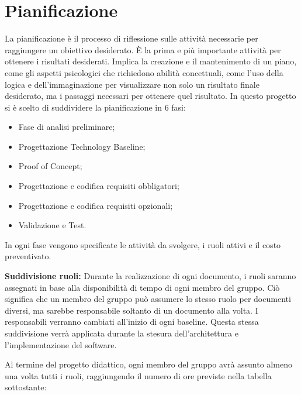 \chapter{Pianificazione}
La pianificazione è il processo di riflessione sulle attività necessarie per raggiungere un obiettivo desiderato. È la prima e più importante attività per ottenere i risultati desiderati. Implica la creazione e il mantenimento di un piano, come gli aspetti psicologici che richiedono abilità concettuali, come l'uso della logica e dell'immaginazione per visualizzare non solo un risultato finale desiderato, ma i passaggi necessari per ottenere quel risultato. In questo progetto si è scelto di suddividere la pianificazione in 6 fasi: 
\begin{itemize}
    \item Fase di analisi preliminare;
    \item Progettazione Technology Baseline;
    \item Proof of Concept;
    \item Progettazione e codifica requisiti obbligatori;
    \item Progettazione e codifica requisiti opzionali;
    \item Validazione e Test.
\end{itemize}
In ogni fase vengono specificate le attività da svolgere, i ruoli attivi e il costo preventivato.

\textbf{Suddivisione ruoli:}
Durante la realizzazione di ogni documento, i ruoli saranno assegnati in base alla disponibilità di tempo di ogni membro del gruppo. Ciò significa che un membro del gruppo può assumere lo stesso ruolo per documenti diversi, ma sarebbe responsabile soltanto di un documento alla volta. I responsabili verranno cambiati all'inizio di ogni baseline. Questa stessa suddivisione verrà applicata durante la stesura dell'architettura e l'implementazione del software.

Al termine del progetto didattico, ogni membro del gruppo avrà assunto almeno una volta tutti i ruoli, raggiungendo il numero di ore previste nella tabella sottostante:

